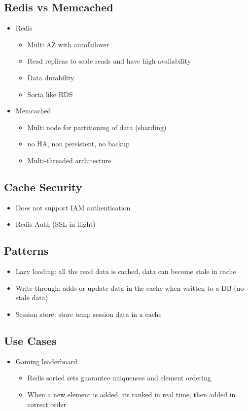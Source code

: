 \documentclass[]{scrartcl}
\begin{document}
\subsection{Redis vs Memcached}
\begin{itemize}
	\item Redis
	\begin{itemize}
		\item Multi AZ with autofailover
		\item Read replicas to scale reads and have high availability
		\item Data durability
		\item Sorta like RDS
	\end{itemize}
	\item Memcached
	\begin{itemize}
		\item Multi node for partitioning of data (sharding)
		\item no HA, non persistent, no backup
		\item Multi-threaded architecture
	\end{itemize}
\end{itemize}

\subsection{Cache Security}
\begin{itemize}
	\item Does not support IAM authentication
	\item Redis Auth (SSL in flight)
\end{itemize}

\subsection{Patterns}
\begin{itemize}
	\item Lazy loading: all the read data is cached, data can become stale in cache
	\item Write through: adds or update data in the cache when written to a DB (no stale data)
	\item Session store: store temp session data in a cache
\end{itemize}

\subsection{Use Cases}
\begin{itemize}
	\item Gaming leaderboard
	\begin{itemize}
		\item Redis sorted sets guarantee uniqueness and element ordering
		\item When a new element is added, its ranked in real time, then added in correct order
	\end{itemize}
\end{itemize}
\end{document}
